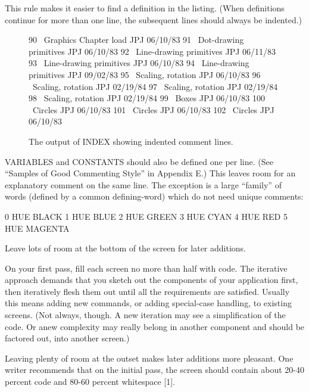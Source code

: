 This rule makes it easier to find a definition in the listing.  (When definitions
continue for more than one line, the subsequent lines should always
be indented.)
\begin{figure*}
\caption{The output of INDEX showing indented comment lines.}
\begin{Code}
 90 \ Graphics         Chapter load     JPJ 06/10/83
 91    \ Dot-drawing primitives         JPJ 06/10/83
 92 \ Line-drawing primitives           JPJ 06/11/83
 93    \ Line-drawing primitives        JPJ 06/10/83
 94    \ Line-drawing primitives        JPJ 09/02/83
 95 \ Scaling, rotation                 JPJ 06/10/83
 96    \ Scaling, rotation              JPJ 02/19/84
 97    \ Scaling, rotation              JPJ 02/19/84
 98    \ Scaling, rotation              JPJ 02/19/84
 99 \ Boxes                             JPJ 06/10/83
100 \ Circles                           JPJ 06/10/83
101    \ Circles                        JPJ 06/10/83
102    \ Circles                        JPJ 06/10/83
\end{Code}
\end{figure*}

VARIABLES and CONSTANTS should also be defined one per
line.  (See ``Samples of Good Commenting Style'' in Appendix E.) This
leaves room for an explanatory comment on the same line.  The exception
is a large ``family'' of words (defined by a common defining-word) which
do not need unique comments:
\begin{Code}
0 HUE BLACK     1 HUE BLUE      2 HUE GREEN
3 HUE CYAN      4 HUE RED       5 HUE MAGENTA
\end{Code}
\begin{tip}
Leave lots of room at the bottom of the screen for later additions.
\end{tip}

On your first pass, fill each screen no more than half with code.  The
iterative approach demands that you sketch out the components of your
application first, then iteratively flesh them out until all the requirements
are satisfied.  Usually this means adding new commands, or
adding special-case handling, to existing screens.  (Not always, though.  A
new iteration may see a simplification of the code.  Or anew complexity
may really belong in another component and should be factored out, into
another screen.)

Leaving plenty of room at the outset makes later additions more
pleasant.  One writer recommends that on the initial pass, the screen
should contain about 20-40 percent code and 80-60 percent whitespace [1].

